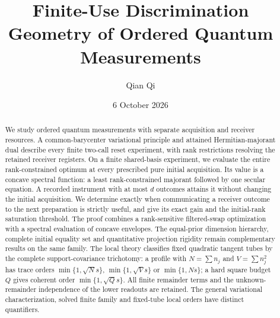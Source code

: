 \documentclass[11pt]{amsart}
\title[Finite-use discrimination geometry]{Finite-Use Discrimination Geometry of Ordered Quantum Measurements}
\author{Qian Qi}
\date{6 October 2026}
\numberwithin{equation}{section}
\theoremstyle{definition}\newtheorem{definition}[theorem]{Definition}
\theoremstyle{remark}\newtheorem{remark}[theorem]{Remark}
\begin{document}
\raggedbottom
\begin{abstract}
We study ordered quantum measurements with separate acquisition and
receiver resources.  A common-barycenter variational principle and
attained Hermitian-majorant dual describe every finite two-call reset
experiment, with rank restrictions resolving the retained receiver
registers.  On a finite shared-basis experiment, we evaluate the entire
rank-constrained optimum at every prescribed pure initial acquisition.
Its value is a concave spectral function: a least rank-constrained
majorant followed by one secular equation.  A recorded instrument with
at most $d$ outcomes attains it without changing the initial acquisition.
We determine exactly when communicating a receiver outcome to the next
preparation is strictly useful, and give its exact gain and the
initial-rank saturation threshold.  The proof combines a rank-sensitive
filtered-swap optimization with a spectral evaluation of concave
envelopes.  The equal-prior dimension hierarchy, complete initial
equality set and quantitative projection rigidity remain complementary
results on the same family.  The local theory classifies fixed quadratic
tangent tubes by the complete support-covariance trichotomy: a profile
with $N=\sum n_j$ and $V=\sum n_j^2$ has trace orders
$\min\{1,\sqrt Ns\}$, $\min\{1,\sqrt Vs\}$ or $\min\{1,Ns\}$;
a hard square budget $Q$ gives coherent order $\min\{1,\sqrt Qs\}$.
All finite remainder terms and the unknown-remainder independence of the
lower readouts are retained.  The general variational characterization,
solved finite family and fixed-tube local orders have distinct quantifiers.
\end{abstract}
\maketitle






















\end{document}
